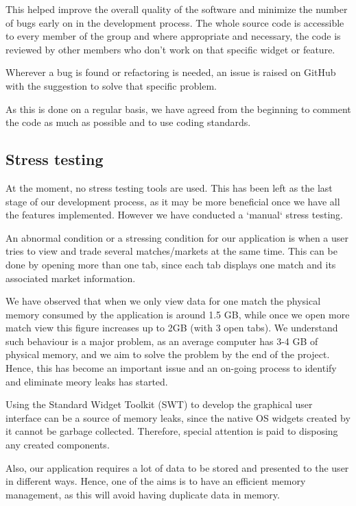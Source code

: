 \documentclass[10pt]{article}
\begin{document}
This helped improve the overall quality of the software and minimize the number of bugs early on in the development process.
The whole source code is accessible to every member of the group and where appropriate and necessary, the code is reviewed by other members who don’t work on that specific widget or feature. 

Wherever a bug is found or refactoring is needed, an issue is raised on GitHub with the suggestion to solve that specific problem.

As this is done on a regular basis, we have agreed from the beginning to comment the code as much as possible and to use coding standards.

\subsection{Stress testing}

At the moment, no stress testing tools are used. This has been left as the last stage of our development process, as it may be more beneficial once we have all the features implemented. However we have conducted a `manual` stress testing.

An abnormal condition or a stressing condition for our application is when a user tries to view and trade several matches/markets at the same time. This can be done by opening more than one tab, since each tab displays one match and its associated market information.

We have observed that when we only view data for one match the physical memory consumed by the application is around 1.5 GB, while once we open more match view this figure increases up to 2GB (with 3 open tabs). We understand such behaviour is a major problem, as an average computer has 3-4 GB of physical memory, and we aim to solve the problem by the end of the project. Hence, this has become an important issue and an on-going process to identify and eliminate meory leaks has started.

Using the Standard Widget Toolkit (SWT) to develop the graphical user interface can be a source of memory leaks, since the native OS widgets created by it cannot be garbage collected. Therefore, special attention is paid to disposing any created components.

Also, our application requires a lot of data to be stored and presented to the user in different ways. Hence, one of the aims is to have an efficient memory management, as this will avoid having duplicate data in memory.
\end{document}
